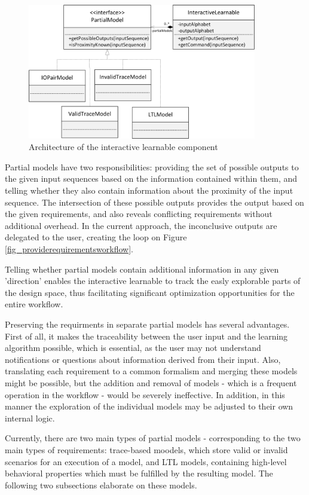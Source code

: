 \begin{figure}[!ht] 
	\centering
	\includegraphics[width=100mm, keepaspectratio]{figures/architecture_interactivelearnable.png}
	\caption{Architecture of the interactive learnable component} 
	\label{fig_architcture_interactivelearnable}
\end{figure}

Partial models have two responsibilities: providing the set of possible outputs to the given input sequences based on the information contained within them, and telling whether they also contain information about the proximity of the input sequence. The intersection of these possible outputs provides the output based on the given requirements, and also reveals conflicting requirements without additional overhead. In the current approach, the inconclusive outputs are delegated to the user, creating the loop on Figure \ref{fig_providerequirementsworkflow}.

Telling whether partial models contain additional information in any given 'direction' enables the interactive learnable to track the easly explorable parts of the design space, thus facilitating significant optimization opportunities for the entire workflow.

Preserving the requirments in separate partial models has several advantages. First of all, it makes the traceability between the user input and the learning algorithm possible, which is essential, as the user may not understand notifications or questions about information derived from their input. Also, translating each requirement to a common formalism and merging these models might be possible, but the addition and removal of models - which is a frequent operation in the workflow - would be severely ineffective. In addition, in this manner the exploration of the individual models may be adjusted to their own internal logic.

Currently, there are two main types of partial models - corresponding to the two main types of requirements: trace-based moodels, which store valid or invalid scenarios for an execution of a model, and LTL models, containing high-level behavioral properties which must be fulfilled by the resulting model. The following two subsections elaborate on these models. 

